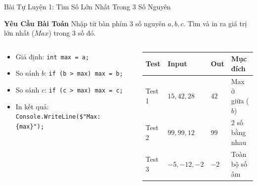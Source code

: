 \documentclass[aspectratio=169, 10pt]{beamer}
\begin{document}
\begin{frame}{Bài Tự Luyện 1: Tìm Số Lớn Nhất Trong 3 Số Nguyên}
  \begin{block}{\textbf{Yêu Cầu Bài Toán}}
    Nhập từ bàn phím 3 số nguyên $a, b, c$. Tìm và in ra giá trị lớn nhất ($Max$) trong 3 số đó.
  \end{block}
  \begin{columns}[T]
    \begin{column}{0.50\textwidth}
      \begin{tcolorbox}[colback=UniLightBlue!30,colframe=UniBlue,title=\textbf{Gợi Ý Thuật Toán Lính Canh}]
        \small
        \begin{itemize}\setlength{\itemsep}{1pt}
          \item Giả định: \texttt{int max = a;}
          \item So sánh $b$: \texttt{if (b > max) max = b;}
          \item So sánh $c$: \texttt{if (c > max) max = c;}
          \item In kết quả: \texttt{Console.WriteLine(\$"Max: \{max\}");}
        \end{itemize}
      \end{tcolorbox}
    \end{column}
    \begin{column}{0.48\textwidth}
      \begin{table}[h]
        \centering
        \scriptsize
        \begin{tabularx}{\textwidth}{lXXp{1.8cm}}
          \toprule
          \textbf{Test} & \textbf{Input} & \textbf{Out} & \textbf{Mục đích} \\
          \midrule
          Test 1 & $15, 42, 28$ & $42$ & Max ở giữa ($b$) \\
          \addlinespace
          Test 2 & $99, 99, 12$ & $99$ & 2 số bằng nhau \\
          \addlinespace
          Test 3 & $-5,-12,-2$ & $-2$ & Toàn bộ số âm \\
          \bottomrule
        \end{tabularx}
      \end{table}
    \end{column}
  \end{columns}
\end{frame}
\end{document}
